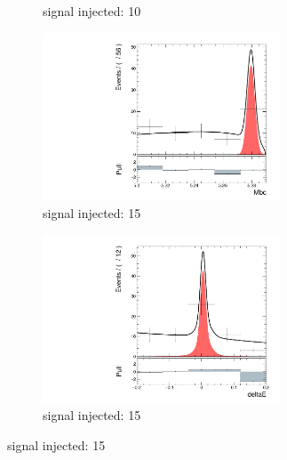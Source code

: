 \begin{figure}[htpb]
\begin{subfigure}{0.5\linewidth}
		\caption{signal injected: 10}
	\end{subfigure}
	\begin{subfigure}{0.5\linewidth}
		\includegraphics[page=1,height=5cm]{figures/injection_sig_15/ds_gen_Mbc_2D.pdf}
		\caption{signal injected: 15}
	\end{subfigure}
	\begin{subfigure}{0.5\linewidth}
		\includegraphics[page=1,height=5cm]{figures/injection_sig_15/ds_gen_deltaE_2D.pdf}
		\caption{signal injected: 15}
	\end{subfigure}
\end{figure}

